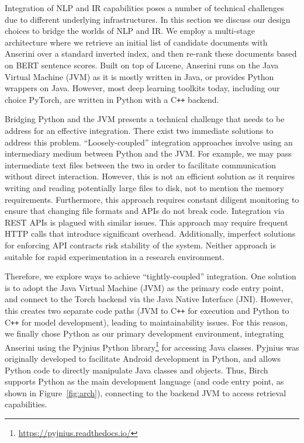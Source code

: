 Integration of NLP and IR capabilities poses a number of technical challenges due to different underlying infrastructures.
In this section we discuss our design choices to bridge the worlds of NLP and IR.
We employ a multi-stage architecture where we retrieve an initial list of candidate documents with Anserini over a standard inverted index, and then re-rank these documents based on BERT sentence scores. 
Built on top of Lucene, Anserini runs on the Java Virtual Machine (JVM) as it is mostly written in Java, or provides Python wrappers on Java.
However, most deep learning toolkits today, including our choice PyTorch, are written in Python with a C\texttt{++} backend.

Bridging Python and the JVM presents a technical challenge that needs to be address for an effective integration.
There exist two immediate solutions to address this problem.
``Loosely-coupled'' integration approaches involve using an intermediary medium between Python and the JVM.
For example, we may pass intermediate text files between the two in order to facilitate communication without direct interaction.
However, this is not an efficient solution as it requires writing and reading potentially large files to disk, not to mention the memory requirements.
Furthermore, this approach requires constant diligent monitoring to ensure that changing file formats and APIs do not break code.
Integration via REST APIs is plagued with similar issues.
This approach may require frequent HTTP calls that introduce significant overhead.
Additionally, imperfect solutions for enforcing API contracts risk stability of the system.
Neither approach is suitable for rapid experimentation in a research environment.

Therefore, we explore ways to achieve ``tightly-coupled'' integration.
One solution is to adopt the Java Virtual Machine (JVM) as the primary code entry point, and connect to the Torch backend via the Java Native Interface (JNI).
However, this creates two separate code paths (JVM to C\texttt{++} for execution and Python to C\texttt{++} for model development), leading to maintainability issues.
For this reason, we finally chose Python as our primary development environment, integrating Anserini using the Pyjnius Python library\footnote{\url{https://pyjnius.readthedocs.io/}} for accessing Java classes.
Pyjnius was originally developed to facilitate Android development in Python, and allows Python code to directly manipulate Java classes and objects.
Thus, Birch supports Python as the main development language (and code entry point, as shown in Figure~\ref{fig:arch}), connecting to the backend JVM to access retrieval capabilities.

